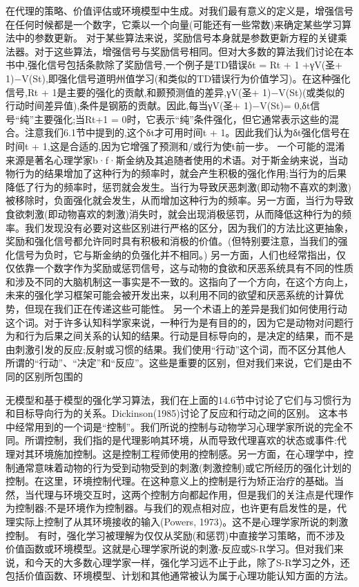 在代理的策略、价值评估或环境模型中生成。对我们最有意义的定义是，增强信号在任何时候都是一个数字，它乘以一个向量(可能还有一些常数)来确定某些学习算法中的参数更新。
对于某些算法来说，奖励信号本身就是参数更新方程的关键乘法器。对于这些算法，增强信号与奖励信号相同。但对大多数的算法我们讨论在本书中,强化信号包括条款除了奖励信号,一个例子是TD错误δt = Rt + 1 +γV(圣+ 1)−V(St),即强化信号道明州值学习(和类似的TD错误行为价值学习)。在这种强化信号,Rt + 1是主要的强化的贡献,和颞预测值的差异,γV(圣+ 1)−V(St)(或类似的行动时间差异值),条件是钢筋的贡献。因此,每当γV(圣+ 1)−V(St)= 0,δt信号“纯”主要强化;当Rt+1 = 0时，它表示“纯”条件强化，但它通常表示这些的混合。注意我们6.1节中提到的,这个δt才可用时间t + 1。因此我们认为δt强化信号在时间t + 1,这是合适的,因为它增强了预测和/或行为使t前一步。
一个可能的混淆来源是著名心理学家b·f·斯金纳及其追随者使用的术语。对于斯金纳来说，当动物行为的结果增加了这种行为的频率时，就会产生积极的强化作用;当行为的后果降低了行为的频率时，惩罚就会发生。当行为导致厌恶刺激(即动物不喜欢的刺激)被移除时，负面强化就会发生，从而增加这种行为的频率。另一方面，当行为导致食欲刺激(即动物喜欢的刺激)消失时，就会出现消极惩罚，从而降低这种行为的频率。我们发现没有必要对这些区别进行严格的区分，因为我们的方法比这更抽象，奖励和强化信号都允许同时具有积极和消极的价值。(但特别要注意，当我们的强化信号为负时，它与斯金纳的负强化并不相同。)
另一方面，人们也经常指出，仅仅依靠一个数字作为奖励或惩罚信号，这与动物的食欲和厌恶系统具有不同的性质和涉及不同的大脑机制这一事实是不一致的。这指向了一个方向，在这个方向上，未来的强化学习框架可能会被开发出来，以利用不同的欲望和厌恶系统的计算优势，但现在我们正在传递这些可能性。
另一个术语上的差异是我们如何使用行动这个词。对于许多认知科学家来说，一种行为是有目的的，因为它是动物对问题行为和行为后果之间关系的认知的结果。行动是目标导向的，是决定的结果，而不是由刺激引发的反应;反射或习惯的结果。我们使用“行动”这个词，而不区分其他人所谓的“行动”、“决定”和“反应”。这些是重要的区别，但对我们来说，它们是由不同的区别所包围的

无模型和基于模型的强化学习算法，我们在上面的14.6节中讨论了它们与习惯行为和目标导向行为的关系。Dickinson(1985)讨论了反应和行动之间的区别。
这本书中经常用到的一个词是“控制”。我们所说的控制与动物学习心理学家所说的完全不同。所谓控制，我们指的是代理影响其环境，从而导致代理喜欢的状态或事件:代理对其环境施加控制。这是控制工程师使用的控制感。另一方面，在心理学中，控制通常意味着动物的行为受到动物受到的刺激(刺激控制)或它所经历的强化计划的控制。在这里，环境控制代理。在这种意义上的控制是行为矫正治疗的基础。当然，当代理与环境交互时，这两个控制方向都起作用，但是我们的关注点是代理作为控制器;不是环境作为控制器。与我们的观点相对应，也许更有启发性的是，代理实际上控制了从其环境接收的输入(Powers, 1973)。这不是心理学家所说的刺激控制。
有时，强化学习被理解为仅仅从奖励(和惩罚)中直接学习策略，而不涉及价值函数或环境模型。这就是心理学家所说的刺激-反应或S-R学习。但对我们来说，和今天的大多数心理学家一样，强化学习远不止于此，除了S-R学习之外，还包括价值函数、环境模型、计划和其他通常被认为属于心理功能认知方面的方法。

